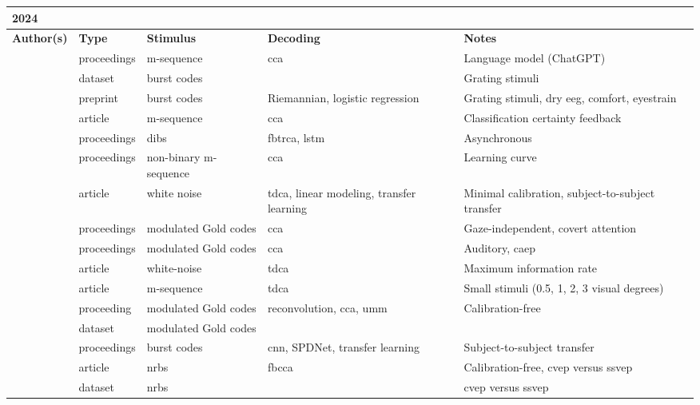 \documentclass[a4paper,landscape]{article}
\begin{document}
	
\begin{table}[H]
	\begin{tabular}{p{5cm}p{2cm}p{5cm}p{5cm}p{6.5cm}}
		\textbf{2024} & & & & \\ 
		\toprule
		\textbf{Author(s)} & \textbf{Type} & \textbf{Stimulus} & \textbf{Decoding} & \textbf{Notes} \\ 
		\midrule
		\citeauthor{canturk2024} & proceedings & m-sequence & \acrshort{cca} & Language model (ChatGPT) \\
		\citeauthor{castillos2024dataset} & dataset & burst codes & & Grating stimuli \\
		\citeauthor{dehais2024} & preprint & burst codes & Riemannian, logistic regression & Grating stimuli, dry \acrshort{eeg}, comfort, eyestrain \\
		\citeauthor{fodor2024} & article & m-sequence & \acrshort{cca} & Classification certainty feedback \\
		\citeauthor{lai2024} & proceedings & \acrshort{dibs} & \acrfull{fbtrca}, \acrshort{lstm} & Asynchronous \\
		\citeauthor{martinez2024} & proceedings & non-binary m-sequence & \acrshort{cca} & Learning curve \\
		\citeauthor{miao2024} & article & white noise & \acrshort{tdca}, linear modeling, transfer learning & Minimal calibration, subject-to-subject transfer \\
		\citeauthor{narayanan2024} & proceedings & modulated Gold codes & \acrshort{cca} & Gaze-independent, covert attention \\
		\citeauthor{scheppink2024} & proceedings & modulated Gold codes & \acrshort{cca} & Auditory, \acrshort{caep} \\
		\citeauthor{shi2024} & article & white-noise & \acrshort{tdca} & Maximum information rate \\
		\citeauthor{sun2024} & article & m-sequence & \acrshort{tdca} & Small stimuli (0.5, 1, 2, 3 visual degrees) \\
		\citeauthor{thielen2024} & proceeding & modulated Gold codes & reconvolution, \acrshort{cca}, \acrshort{umm} & Calibration-free \\
		\citeauthor{thielen2024dataset} & dataset & modulated Gold codes & & \\
		\citeauthor{velut2024} & proceedings & burst codes & \acrshort{cnn}, SPDNet, transfer learning & Subject-to-subject transfer \\
		\citeauthor{zheng2024a} & article & \acrshort{nrbs} & \acrshort{fbcca} & Calibration-free, \acrshort{cvep} versus \acrshort{ssvep} \\
		\citeauthor{zheng2024b} & dataset & \acrshort{nrbs} & & \acrshort{cvep} versus \acrshort{ssvep} \\
		\bottomrule
	\end{tabular}
\end{table}
\end{document}

